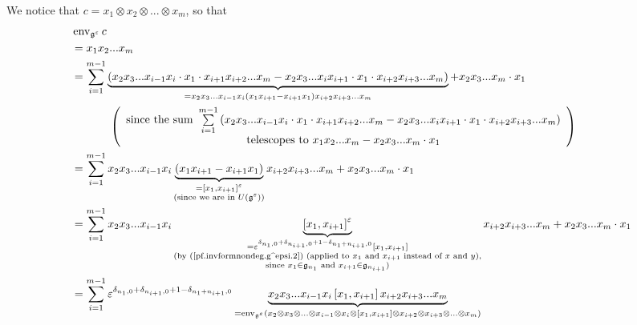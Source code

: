 \documentclass[etingof-lie.tex]{subfiles}
\begin{document}
We notice that $c=x_{1}\otimes x_{2}\otimes...\otimes x_{m}$, so that%
\begin{align}
&  \operatorname*{env}\nolimits_{\mathfrak{g}^{\varepsilon}}c\nonumber\\
&  =x_{1}x_{2}...x_{m}\nonumber\\
&  =\sum\limits_{i=1}^{m-1}\underbrace{\left(  x_{2}x_{3}...x_{i-1}x_{i}\cdot
x_{1}\cdot x_{i+1}x_{i+2}...x_{m}-x_{2}x_{3}...x_{i}x_{i+1}\cdot x_{1}\cdot
x_{i+2}x_{i+3}...x_{m}\right)  }_{=x_{2}x_{3}...x_{i-1}x_{i}\left(
x_{1}x_{i+1}-x_{i+1}x_{1}\right)  x_{i+2}x_{i+3}...x_{m}}+x_{2}x_{3}%
...x_{m}\cdot x_{1}\nonumber\\
&  \ \ \ \ \ \ \ \ \ \ \left(
\begin{array}
[c]{c}%
\text{since the sum }\sum\limits_{i=1}^{m-1}\left(  x_{2}x_{3}...x_{i-1}%
x_{i}\cdot x_{1}\cdot x_{i+1}x_{i+2}...x_{m}-x_{2}x_{3}...x_{i}x_{i+1}\cdot
x_{1}\cdot x_{i+2}x_{i+3}...x_{m}\right) \\
\text{telescopes to }x_{1}x_{2}...x_{m}-x_{2}x_{3}...x_{m}\cdot x_{1}%
\end{array}
\right) \nonumber\\
&  =\sum\limits_{i=1}^{m-1}x_{2}x_{3}...x_{i-1}x_{i}\underbrace{\left(
x_{1}x_{i+1}-x_{i+1}x_{1}\right)  }_{\substack{=\left[  x_{1},x_{i+1}\right]
^{\varepsilon}\\\text{(since we are in }U\left(  \mathfrak{g}^{\varepsilon
}\right)  \text{)}}}x_{i+2}x_{i+3}...x_{m}+x_{2}x_{3}...x_{m}\cdot
x_{1}\nonumber\\
&  =\sum\limits_{i=1}^{m-1}x_{2}x_{3}...x_{i-1}x_{i}\underbrace{\left[
x_{1},x_{i+1}\right]  ^{\varepsilon}}_{\substack{=\varepsilon^{\delta
_{n_{1},0}+\delta_{n_{i+1},0}+1-\delta_{n_{1}+n_{i+1},0}}\left[  x_{1}%
,x_{i+1}\right]  \\\text{(by (\ref{pf.invformnondeg.g^epsi.2}) (applied to
}x_{1}\text{ and }x_{i+1}\text{ instead of }x\text{ and }y\text{),}%
\\\text{since }x_{1}\in\mathfrak{g}_{n_{1}}\text{ and }x_{i+1}\in
\mathfrak{g}_{n_{i+1}}\text{)}}}x_{i+2}x_{i+3}...x_{m}+x_{2}x_{3}...x_{m}\cdot
x_{1}\nonumber\\
&  =\sum\limits_{i=1}^{m-1}\varepsilon^{\delta_{n_{1},0}+\delta_{n_{i+1}%
,0}+1-\delta_{n_{1}+n_{i+1},0}}\underbrace{x_{2}x_{3}...x_{i-1}x_{i}\left[
x_{1},x_{i+1}\right]  x_{i+2}x_{i+3}...x_{m}}_{=\operatorname*{env}%
\nolimits_{\mathfrak{g}^{\varepsilon}}\left(  x_{2}\otimes x_{3}%
\otimes...\otimes x_{i-1}\otimes x_{i}\otimes\left[  x_{1},x_{i+1}\right]
\otimes x_{i+2}\otimes x_{i+3}\otimes...\otimes x_{m}\right)  }\nonumber\\

\end{align}
\end{document}
